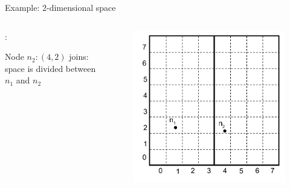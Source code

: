 \begin{frame}{Example: 2-dimensional space}

\begin{columns}
\begin{column}{0.5\textwidth}
:\\
\BI
\item Node $n_2:(4, 2)$ joins: space is divided between $n_1$ and $n_2$
\EI
\end{column}
\begin{column}{0.5\textwidth}
\begin{figure}
	\includegraphics[width=1.0\textwidth]{figs/10/can2}
\end{figure}
\end{column}
\end{columns}
		
\end{frame}	

